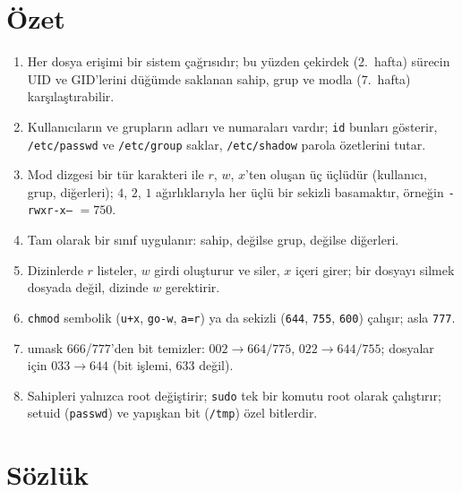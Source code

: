 \documentclass[11pt,a4paper]{article}
\newcommand{\cmd}[1]{\texttt{#1}}
\begin{document}
\section{Özet}

\begin{keyidea}
\begin{enumerate}[leftmargin=1.4em]
  \item Her dosya erişimi bir sistem çağrısıdır; bu yüzden çekirdek (2.~hafta) sürecin UID ve GID'lerini düğümde saklanan sahip, grup ve modla (7.~hafta) karşılaştırabilir.
  \item Kullanıcıların ve grupların adları ve numaraları vardır; \cmd{id} bunları gösterir, \texttt{/etc/passwd} ve \texttt{/etc/group} saklar, \texttt{/etc/shadow} parola özetlerini tutar.
  \item Mod dizgesi bir tür karakteri ile $r$, $w$, $x$'ten oluşan üç üçlüdür (kullanıcı, grup, diğerleri); $4$, $2$, $1$ ağırlıklarıyla her üçlü bir sekizli basamaktır, örneğin \texttt{-rwxr-x---} $= 750$.
  \item Tam olarak bir sınıf uygulanır: sahip, değilse grup, değilse diğerleri.
  \item Dizinlerde $r$ listeler, $w$ girdi oluşturur ve siler, $x$ içeri girer; bir dosyayı silmek dosyada değil, dizinde $w$ gerektirir.
  \item \cmd{chmod} sembolik (\texttt{u+x}, \texttt{go-w}, \texttt{a=r}) ya da sekizli (\texttt{644}, \texttt{755}, \texttt{600}) çalışır; asla \texttt{777}.
  \item umask $666$/$777$'den bit temizler: $002 \to 664/775$, $022 \to 644/755$; dosyalar için $033 \to 644$ (bit işlemi, $633$ değil).
  \item Sahipleri yalnızca root değiştirir; \cmd{sudo} tek bir komutu root olarak çalıştırır; setuid (\cmd{passwd}) ve yapışkan bit (\texttt{/tmp}) özel bitlerdir.
\end{enumerate}
\end{keyidea}

\section{Sözlük}
\end{document}
